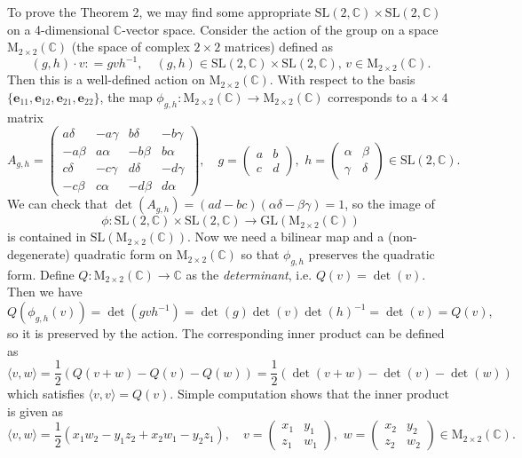 \documentclass{article}
\newcommand{\SL}{\mathrm{SL}}
\newcommand{\GL}{\mathrm{GL}}
\newcommand{\Ma}{\mathrm{M}}
\begin{document}
To prove the Theorem 2, we may find some appropriate $\SL(2, \mathbb{C})\times \SL(2, \mathbb{C})$ on a 4-dimensional $\mathbb{C}$-vector space. 
Consider the action of the group on a space $\Ma_{2\times 2}(\mathbb{C})$ (the space of complex $2\times 2$ matrices) defined as 
$$
(g, h)\cdot v: = gvh^{-1}, \quad (g, h)\in \SL(2, \mathbb{C})\times\SL(2, \mathbb{C}), \, v\in \Ma_{2\times 2}(\mathbb{C}). 
$$
Then this is a well-defined action on $\Ma_{2\times 2}(\mathbb{C})$. With respect to the basis $\{\mathbf{e}_{11}, \mathbf{e}_{12}, \mathbf{e}_{21}, \mathbf{e}_{22}\}$, the map $\phi_{g, h}:\Ma_{2\times 2}(\mathbb{C})\to \Ma_{2\times 2}(\mathbb{C})$ corresponds to a $4\times 4$ matrix
$$
A_{g, h}=
\begin{pmatrix}
a\delta & -a\gamma & b\delta & -b\gamma \\
-a\beta & a\alpha & -b\beta & b\alpha \\
c\delta & -c\gamma & d\delta & -d\gamma \\
-c\beta & c\alpha & -d\beta & d\alpha
\end{pmatrix}, \quad g = \begin{pmatrix} a&b\\c&d \end{pmatrix} , \,\, h = \begin{pmatrix} \alpha&\beta \\ \gamma & \delta\end{pmatrix} \in \SL(2, \mathbb{C}).
$$
We can check that $\det(A_{g, h}) = (ad-bc)(\alpha\delta - \beta\gamma) = 1$, so the image of $$\phi:\SL(2, \mathbb{C})\times\SL(2, \mathbb{C})\to \GL(\Ma_{2\times 2}(\mathbb{C}))$$ is contained in $\SL(\Ma_{2\times 2}(\mathbb{C}))$. 
Now we need a bilinear map and a (non-degenerate) quadratic form on $\Ma_{2\times 2}(\mathbb{C})$ so that $\phi_{g, h}$ preserves the quadratic form. 
Define $Q:\Ma_{2\times 2}(\mathbb{C})\to \mathbb{C}$ as the \emph{determinant}, i.e. $Q(v) = \det(v)$. 
Then we have $$Q(\phi_{g, h}(v)) = \det(gvh^{-1}) = \det(g)\det(v)\det(h)^{-1} = \det(v) = Q(v),$$ so it is preserved by the action. 
The corresponding inner product can be defined as
$$
\langle v, w\rangle = \frac{1}{2}\left( Q(v+w)-Q(v)-Q(w)\right) = \frac{1}{2}(\det(v+w) - \det(v) - \det(w))
$$
which satisfies $\langle v, v\rangle = Q(v)$. Simple computation shows that the inner product is given as
$$
\langle v, w\rangle = \frac{1}{2}(x_{1}w_{2} - y_{1}z_{2} + x_{2}w_{1}- y_{2}z_{1}), \quad v = \begin{pmatrix} x_{1} & y_{1} \\ z_{1} & w_{1}\end{pmatrix}, \,\, w = \begin{pmatrix} x_{2} & y_{2} \\ z_{2} & w_{2}\end{pmatrix} \in \Ma_{2\times 2}(\mathbb{C}).  
$$
\end{document}
